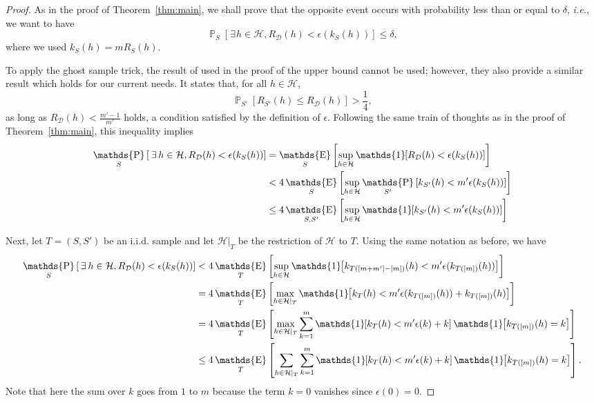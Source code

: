 \documentclass[twoside,11pt]{article}
\newcommand{\ie}{\emph{i.e.\xspace}}
\newcommand{\Id}[1]{\mathds{1}\hspace{-2.5pt}\left[#1\right]}
\let\oldexists=\exists
\renewcommand{\exists}{\hspace{1pt}\oldexists\hspace{1pt}}
\newcommand{\D}{\mathcal{D}}
\renewcommand{\H}{{\mathcal{H}}}
\DeclareMathOperator*{\Prob}{\mathds{P}}
\newcommand{\prob}[2]{\Prob_{#1}\left[#2\right]}
\DeclareMathOperator*{\Expectation}{\mathds{E}}
\newcommand{\exv}[2]{\Expectation_{#1}\left[#2\right]}
\begin{document}
\begin{proof}
As in the proof of Theorem~\ref{thm:main}, we shall prove that the opposite event occurs with probability less than or equal to $\delta$, \ie, we want to have
\begin{equation*}
\prob{S}{\exists h \in \H, R_\D(h) < \epsilon(k_S(h))} \le \delta,
\end{equation*}
where we used $k_S(h) = m R_S(h)$.

To apply the ghost sample trick, the result of \citet{greenberg14} used in the proof of the upper bound cannot be used; however, they also provide a similar result which holds for our current needs.
It states that, for all $h\in\H$,
\begin{equation*}
    \prob{S'}{R_{S'}(h) \le R_\D(h)} > \frac{1}{4},
\end{equation*}
as long as $R_\D(h) < \frac{m'-1}{m'}$ holds, a condition satisfied by the definition of $\epsilon$.
Following the same train of thoughts as in the proof of Theorem~\ref{thm:main}, this inequality implies
\begin{align*}
\prob{S}{\exists h \in \H, R_\D(h) < \epsilon(k_S(h))}
&= \exv{S}{\sup_{h\in\H} \Id{R_\D(h) < \epsilon(k_S(h))} }\\
&< 4 \exv{S}{\sup_{h\in\H} \prob{S'}{k_{S'}(h) < m'\epsilon(k_S(h))} }\\
&\le 4 \exv{S,S'}{\sup_{h\in\H} \Id{k_{S'}(h) < m'\epsilon(k_S(h))} }\\
\end{align*}

Next, let $T=(S,S')$ be an i.i.d. sample and let $\H|_T$ be the restriction of $\H$ to $T$.
Using the same notation as before, we have
\begin{align*}
\prob{S}{\exists h \in \H, R_\D(h) < \epsilon(k_S(h))}
&< 4 \exv{T}{\sup_{h\in\H} \Id{k_{T([m+m']-[m])}(h) < m'\epsilon(k_{T([m])}(h))} }\\
&= 4 \exv{T}{\max_{h\in\H|_T} \Id{k_{T}(h) < m'\epsilon(k_{T([m])}(h)) +k_{T([m])}(h) } }\\
&= 4 \exv{T}{\max_{h\in\H|_T} \sum_{k=1}^m \Id{k_{T}(h) < m'\epsilon(k) +k } \Id{k_{T([m])}(h) = k} }\\
&\le 4 \exv{T}{\sum_{h\in\H|_T} \sum_{k=1}^m \Id{k_{T}(h) < m'\epsilon(k) +k } \Id{k_{T([m])}(h) = k} }.
\end{align*}
Note that here the sum over $k$ goes from $1$ to $m$ because the term $k=0$ vanishes since $\epsilon(0)=0$.


\end{proof}
\end{document}
